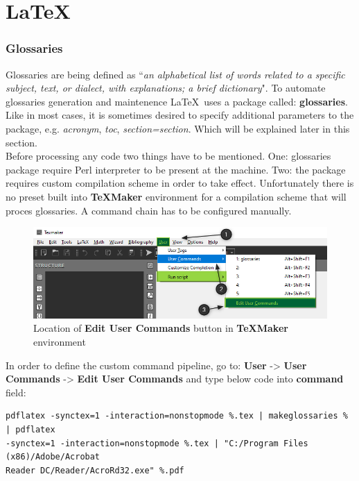 \part{\LaTeX}
\section{Glossaries}

Glossaries are being defined as ``\textit{an alphabetical list of words related to a specific subject, text, or dialect, with explanations; a brief dictionary}". To automate glossaries generation and maintenence \LaTeX\ uses a package called: \textbf{glossaries}. Like in most cases, it is sometimes desired to specify additional parameters to the package, e.g. \textit{acronym}, \textit{toc}, \textit{section=section}. Which will be explained later in this section.\\

Before processing any code two things have to be mentioned. One: glossaries package require Perl interpreter to be present at the machine. Two: the package requires custom compilation scheme in order to take effect. Unfortunately there is no preset built into \textbf{TeXMaker} environment for a compilation scheme that will proces glossaries. A command chain has to be configured manually.

\begin{figure}[H]
\centering
\includegraphics[scale=0.6]{LaTeX/figures/user_command_glossaries_marked.png}
\caption{Location of \textbf{Edit User Commands} button in \textbf{TeXMaker} environment}
\end{figure}

In order to define the custom command pipeline, go to: \textbf{User} -> \textbf{User Commands} -> \textbf{Edit User Commands} and type below code into \textbf{command} field:
\begin{verbatim}
pdflatex -synctex=1 -interaction=nonstopmode %.tex | makeglossaries % | pdflatex 
-synctex=1 -interaction=nonstopmode %.tex | "C:/Program Files (x86)/Adobe/Acrobat
Reader DC/Reader/AcroRd32.exe" %.pdf
\end{verbatim}

